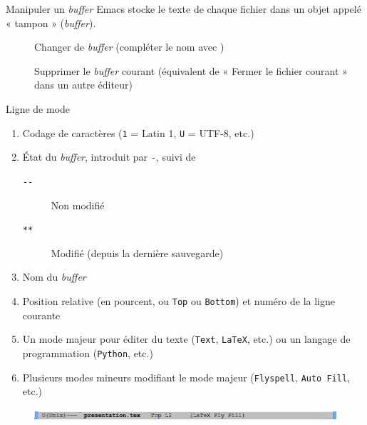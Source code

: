 \documentclass[t]{beamer}
\let\ORIkeys\keys
\renewcommand{\keys}[1]{\ORIkeys{\texttt{#1}}}
\newcommand{\repeatedkeys}[1]{\keys{\textcolor{gray}{#1}}}
\begin{document}
\begin{frame}[label={sec:org06a75f2}]{Manipuler un \emph{buffer}}
Emacs stocke le texte de chaque fichier dans un objet appelé « tampon »
(\emph{buffer}).

\begin{description}
\item[{\keys{C-x} \keys{b}}] Changer de \emph{buffer} (compléter le nom avec \keys{TAB})
\end{description}

\begin{description}
\item[{\repeatedkeys{C-x} \keys{k}}] Supprimer le \emph{buffer} courant (équivalent de « Fermer le fichier courant »
dans un autre éditeur)
\end{description}
\end{frame}

\begin{frame}[fragile,label={sec:org8d4950c}]{Ligne de mode}
 \begin{enumerate}
\item Codage de caractères (\texttt{1} = Latin 1, \texttt{U} = UTF-8, etc.)
\end{enumerate}

\begin{enumerate}
\setcounter{enumi}{1}
\item État du \emph{buffer}, introduit par \texttt{-}, suivi de

\begin{description}
\item[{\texttt{-{}-}}] Non modifié
\item[{\texttt{**}}] Modifié (depuis la dernière sauvegarde)
\end{description}

\item Nom du \emph{buffer}

\item Position relative (en pourcent, ou \texttt{Top} ou \texttt{Bottom}) et numéro de la ligne
courante

\item Un \alert{mode majeur} pour éditer du texte (\texttt{Text}, \texttt{LaTeX}, etc.) ou un langage de
programmation (\texttt{Python}, etc.)

\item Plusieurs \alert{modes mineurs} modifiant le mode majeur (\texttt{Flyspell}, \texttt{Auto Fill}, etc.)
\end{enumerate}

\begin{figure}[!htbp]
\centering
\includegraphics[width=\linewidth]{images/modeline.png}
\end{figure}
\end{frame}
\end{document}
